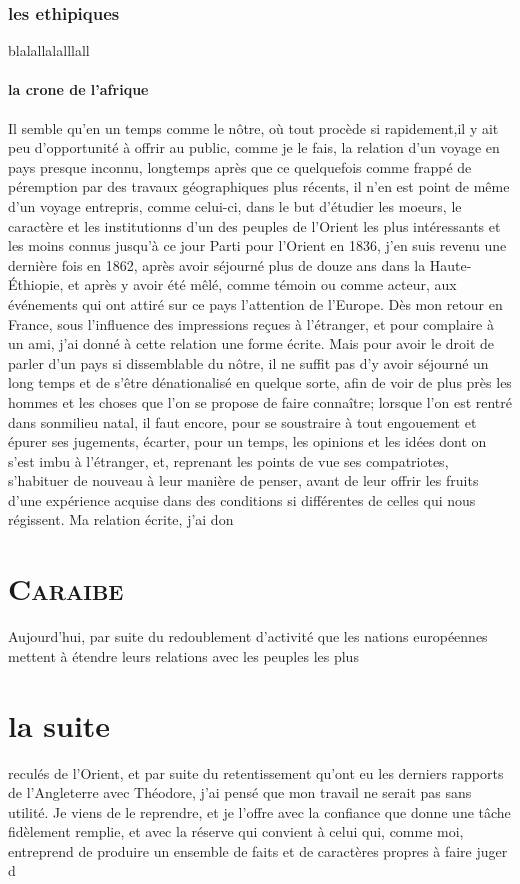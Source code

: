 \documentclass[12pt]{book}
\begin{document}
\subsection{les ethipiques}%
blalallalalllall
\subsubsection{la crone de l'afrique}%
Il semble qu'en un temps comme le nôtre, où tout procède si rapidement,il y ait peu d'opportunité à offrir au public, comme je le fais, la relation d'un voyage en pays presque inconnu, longtemps après que ce quelquefois comme frappé de péremption par des travaux géographiques plus récents, il n'en est point de même d'un voyage entrepris, comme celui-ci, dans le but d'étudier les moeurs, le caractère et les institutionns d'un des peuples de l'Orient les plus intéressants et les moins connus jusqu'à ce jour Parti pour l'Orient en 1836, j'en suis revenu une dernière fois en 1862, après avoir séjourné plus de douze ans dans la Haute-Éthiopie, et après y avoir été mêlé, comme témoin ou comme acteur, aux événements qui ont attiré sur ce pays l'attention de l'Europe. Dès mon retour en France, sous l'influence des impressions reçues à l'étranger, et pour complaire à un ami, j'ai donné à cette relation une forme écrite. Mais pour avoir le droit de parler d'un pays si dissemblable du nôtre, il ne suffit pas d'y avoir séjourné un long temps et de s'être dénationalisé en quelque sorte, afin de voir de plus près les hommes et les choses que l'on se propose de faire connaître; lorsque l'on est rentré dans sonmilieu natal, il faut encore, pour se soustraire à tout engouement et épurer ses jugements, écarter, pour un temps, les opinions et les idées dont on s'est imbu à l'étranger, et, reprenant les points de vue ses compatriotes, s'habituer de nouveau à leur manière de penser, avant de leur offrir les fruits d'une expérience acquise dans des conditions si
différentes de celles qui nous régissent. Ma relation écrite, j'ai don
\chapter{\textsc{Caraibe}}%
Aujourd'hui, par suite du redoublement d'activité que les nations
européennes mettent à étendre leurs relations avec les peuples les plus
\chapter{la suite}
reculés de l'Orient, et par suite du retentissement qu'ont eu les
derniers rapports de l'Angleterre avec Théodore, j'ai pensé que mon
travail ne serait pas sans utilité. Je viens de le reprendre, et je
l'offre avec la confiance que donne une tâche fidèlement remplie, et
avec la réserve qui convient à celui qui, comme moi, entreprend de
produire un ensemble de faits et de caractères propres à faire juger d
\end{document}
